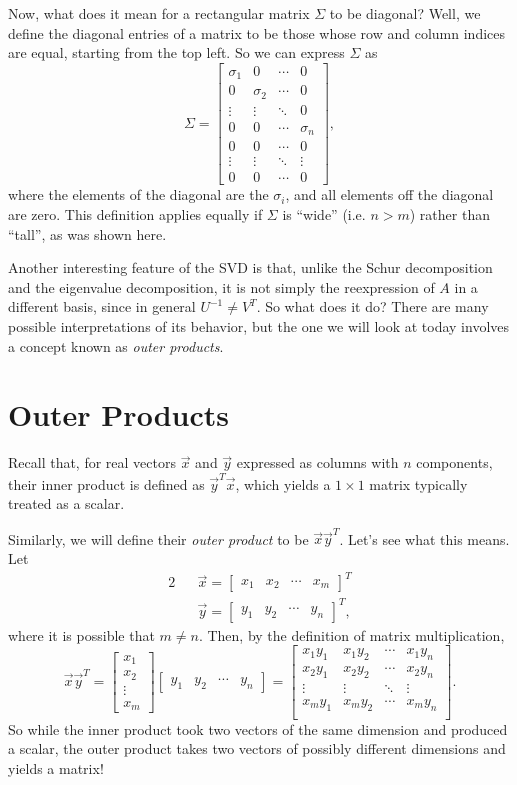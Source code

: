 \documentclass[letterpaper]{article}
\theoremstyle{remark}
\newcommand{\mat}[1]{\ensuremath{\begin{bmatrix}#1\end{bmatrix}}}
\newcommand{\eqn}[1]{\begin{alignat*}{2}#1\end{alignat*}}
\begin{document}
Now, what does it mean for a rectangular matrix $\Sigma$ to be diagonal? Well, we define the diagonal entries of a matrix to be those whose row and column indices are equal, starting from the top left. So we can express $\Sigma$ as
\[
    \Sigma = \mat{\sigma_1 & 0 & \cdots & 0 \\ 0 & \sigma_2 & \cdots & 0 \\
    \vdots & \vdots & \ddots & 0 \\ 0 & 0 & \cdots & \sigma_n \\ 0 & 0 & \cdots & 0 \\ \vdots & \vdots & \ddots & \vdots \\ 0 & 0 & \cdots & 0},
\]
where the elements of the diagonal are the $\sigma_i$, and all elements off the diagonal are zero. This definition applies equally if $\Sigma$ is ``wide'' (i.e. $n > m$) rather than ``tall'', as was shown here.

Another interesting feature of the SVD is that, unlike the Schur decomposition and the eigenvalue decomposition, it is not simply the reexpression of $A$ in a different basis, since in general $U^{-1} \ne V^T$. So what does it do? There are many possible interpretations of its behavior, but the one we will look at today involves a concept known as \emph{outer products}.

\section{Outer Products}
Recall that, for real vectors $\vec{x}$ and $\vec{y}$ expressed as columns with $n$ components, their inner product is defined as $\vec{y}^T\vec{x}$, which yields a $1\times 1$ matrix typically treated as a scalar.

Similarly, we will define their \emph{outer product} to be $\vec{x}\vec{y}^T$. Let's see what this means. Let
\eqn{
    && \vec{x} = \mat{x_1 & x_2 & \cdots & x_m}^T \\
    && \vec{y} = \mat{y_1 & y_2 & \cdots & y_n}^T,
}
where it is possible that $m \ne n$. Then, by the definition of matrix multiplication,
\[
    \vec{x}\vec{y}^T = \mat{x_1 \\ x_2 \\ \vdots \\ x_m}\mat{y_1 & y_2 & \cdots & y_n} = 
    \mat{x_1y_1 & x_1y_2 & \cdots & x_1y_n \\
    x_2y_1 & x_2y_2 & \cdots & x_2y_n \\
    \vdots & \vdots & \ddots & \vdots \\
    x_my_1 & x_my_2 & \cdots & x_my_n \\
    }.
\]
So while the inner product took two vectors of the same dimension and produced a scalar, the outer product takes two vectors of possibly different dimensions and yields a matrix! 
\end{document}
